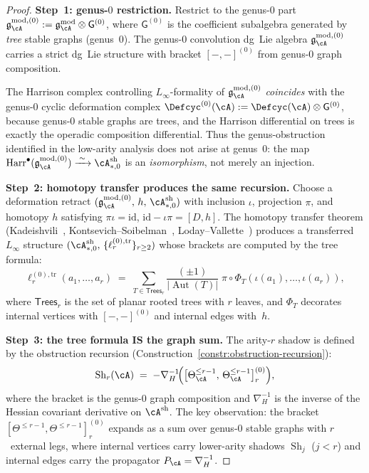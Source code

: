 \begin{theorem}
\begin{proof}
\medskip\noindent
\textbf{Step~1: genus-$0$ restriction.}
Restrict to the genus-$0$ part
$\mathfrak{g}_{\cA}^{\mathrm{mod},(0)} := \mathfrak{g}_{\cA}^{\mathrm{mod}} \otimes \mathsf{G}^{(0)}$,
where $\mathsf{G}^{(0)}$ is the coefficient subalgebra
generated by \emph{tree} stable graphs (genus~$0$).  The
genus-$0$ convolution dg~Lie algebra $\mathfrak{g}_{\cA}^{\mathrm{mod},(0)}$
carries a strict dg~Lie structure with bracket
$[-,-]^{(0)}$ from genus-$0$ graph composition.

The Harrison complex controlling $L_\infty$-formality of
$\mathfrak{g}_{\cA}^{\mathrm{mod},(0)}$ \emph{coincides} with the genus-$0$
cyclic deformation complex
$\Defcyc^{(0)}(\cA) := \Defcyc(\cA) \otimes
\mathsf{G}^{(0)}$, because genus-$0$ stable graphs are
trees, and the Harrison differential on trees is
exactly the operadic composition differential.
Thus the genus-obstruction identified in the
low-arity analysis does not arise at genus~$0$:
the map
$\operatorname{Harr}^\bullet(\mathfrak{g}_{\cA}^{\mathrm{mod},(0)})
\xrightarrow{\;\sim\;}
\cA^{\mathrm{sh}}_{*,0}$
is an \emph{isomorphism}, not merely an injection.

\medskip\noindent
\textbf{Step~2: homotopy transfer produces the same
recursion.}
Choose a deformation retract
$(\mathfrak{g}_{\cA}^{\mathrm{mod},(0)},\, h,\, \cA^{\mathrm{sh}}_{*,0})$
with inclusion $\iota$, projection $\pi$, and homotopy
$h$ satisfying $\pi\iota = \mathrm{id}$,
$\mathrm{id} - \iota\pi = [D, h]$.
The homotopy transfer theorem
(Kadeishvili~\cite{Kadeishvili80},
Kontsevich--Soibelman~\cite{KS00},
Loday--Vallette~\cite{LV12})
produces a transferred $L_\infty$ structure
$(\cA^{\mathrm{sh}}_{*,0},\,
\{\ell_r^{(0),\mathrm{tr}}\}_{r \geq 2})$
whose brackets are computed by the tree formula:
\begin{equation}\label{eq:tree-formula-general}
\ell_r^{(0),\mathrm{tr}}(a_1, \ldots, a_r)
\;=\;
\sum_{T \in \mathsf{Trees}_r}
\frac{(\pm 1)}{|\operatorname{Aut}(T)|}
\;\pi \circ
\Phi_T(\iota(a_1), \ldots, \iota(a_r)),
\end{equation}
where $\mathsf{Trees}_r$ is the set of planar rooted
trees with $r$ leaves, and $\Phi_T$ decorates internal
vertices with $[-,-]^{(0)}$ and internal edges with~$h$.

\medskip\noindent
\textbf{Step~3: the tree formula IS the graph sum.}
The arity-$r$ shadow is defined by the obstruction
recursion (Construction~\ref{constr:obstruction-recursion}):
\[
\operatorname{Sh}_r(\cA)
\;=\;
-\nabla_H^{-1}\!\Bigl(
\bigl[\Theta_\cA^{\leq r-1},\,
\Theta_\cA^{\leq r-1}\bigr]^{(0)}_{r}
\Bigr),
\]
where the bracket is the genus-$0$ graph composition
and $\nabla_H^{-1}$ is the inverse of the Hessian
covariant derivative on $\cA^{\mathrm{sh}}$.
The key observation: the bracket
$[\Theta^{\leq r-1}, \Theta^{\leq r-1}]^{(0)}_r$
expands as a sum over genus-$0$ stable graphs with
$r$~external legs, where internal vertices carry
lower-arity shadows $\operatorname{Sh}_j$ ($j < r$)
and internal edges carry the propagator
$P_\cA = \nabla_H^{-1}$.


\end{proof}
\end{theorem}
